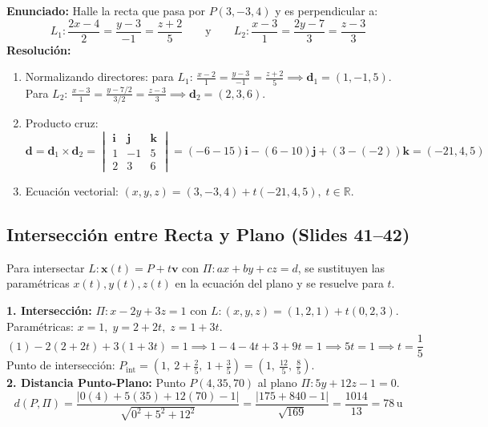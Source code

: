 \documentclass[10pt,letterpaper]{article}
\newcommand{\iu}{\mathbf{i}}
\newcommand{\ju}{\mathbf{j}}
\newcommand{\ku}{\mathbf{k}}
\newcommand{\vv}{\mathbf{v}}
\begin{document}
\begin{cajaEjemplo}
\textbf{Enunciado:} Halle la recta que pasa por $P(3, -3, 4)$ y es perpendicular a:
\[
L_1: \frac{2x - 4}{2} = \frac{y - 3}{-1} = \frac{z + 2}{5} \qquad \text{y} \qquad L_2: \frac{x - 3}{1} = \frac{2y - 7}{3} = \frac{z - 3}{3}
\]
\textbf{Resolución:}
\begin{enumerate}
    \item Normalizando directores: para $L_1$: $\frac{x - 2}{1} = \frac{y - 3}{-1} = \frac{z + 2}{5} \implies \mathbf{d}_1 = (1, -1, 5)$.\\
    Para $L_2$: $\frac{x - 3}{1} = \frac{y - 7/2}{3/2} = \frac{z - 3}{3} \implies \mathbf{d}_2 = (2, 3, 6)$.
    \item Producto cruz:
    \[
    \mathbf{d} = \mathbf{d}_1 \times \mathbf{d}_2 = \begin{vmatrix} \iu & \ju & \ku \\ 1 & -1 & 5 \\ 2 & 3 & 6 \end{vmatrix} = (-6 - 15)\iu - (6 - 10)\ju + (3 - (-2))\ku = (-21, 4, 5)
    \]
    \item Ecuación vectorial: $(x, y, z) = (3, -3, 4) + t(-21, 4, 5), \; t \in \mathbb{R}$.
\end{enumerate}
\end{cajaEjemplo}

\subsection{Intersección entre Recta y Plano (Slides 41--42)}
Para intersectar $L: \mathbf{x}(t) = P + t\vv$ con $\Pi: ax + by + cz = d$, se sustituyen las paramétricas $x(t), y(t), z(t)$ en la ecuación del plano y se resuelve para $t$.

\begin{cajaEjemplo}
\textbf{1. Intersección:} $\Pi: x - 2y + 3z = 1$ con $L: (x,y,z) = (1,2,1) + t(0,2,3)$.
Paramétricas: $x = 1, \; y = 2 + 2t, \; z = 1 + 3t$.
\[
(1) - 2(2 + 2t) + 3(1 + 3t) = 1 \implies 1 - 4 - 4t + 3 + 9t = 1 \implies 5t = 1 \implies t = \frac{1}{5}
\]
Punto de intersección: $P_{\text{int}} = \left(1,\ 2 + \frac{2}{5},\ 1 + \frac{3}{5}\right) = \left(1,\ \frac{12}{5},\ \frac{8}{5}\right)$.\\[0.2cm]
\textbf{2. Distancia Punto-Plano:} Punto $P(4, 35, 70)$ al plano $\Pi: 5y + 12z - 1 = 0$.
\[
d(P, \Pi) = \frac{|0(4) + 5(35) + 12(70) - 1|}{\sqrt{0^2 + 5^2 + 12^2}} = \frac{|175 + 840 - 1|}{\sqrt{169}} = \frac{1014}{13} = 78\,\text{u}
\]
\end{cajaEjemplo}
\end{document}

